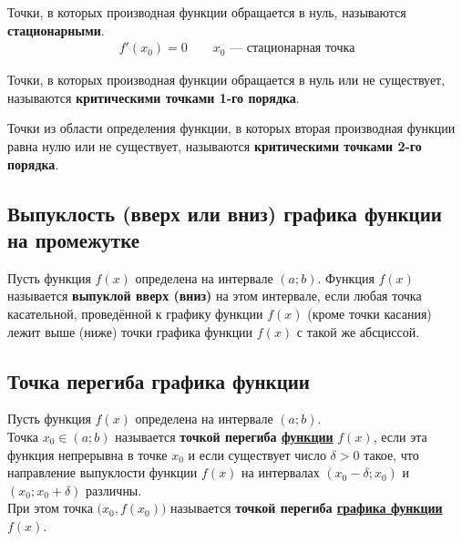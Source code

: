 \begin{definition}
	Точки, в которых производная функции обращается в нуль, называются \textbf{стационарными}.
	\begin{gather*}
		f'(x_0) = 0\qquad x_0 \text{ --- стационарная точка}
	\end{gather*}
\end{definition}

\begin{definition}
	Точки, в которых производная функции обращается в нуль или не существует, называются \textbf{критическими точками 1-го порядка}.
\end{definition}

\begin{definition}
	Точки из области определения функции, в которых вторая производная функции равна нулю или не существует, называются \textbf{критическими точками 2-го порядка}.
\end{definition}

\subsection{Выпуклость (вверх или вниз) графика функции на промежутке}

\begin{definition}
    Пусть функция $f(x)$ определена на интервале $(a;b)$. Функция $f(x)$ называется \textbf{выпуклой вверх (вниз)} на этом интервале, если любая точка касательной, проведённой к графику функции $f(x)$ (кроме точки касания) лежит выше (ниже) точки графика функции $f(x)$ с такой же абсциссой.
\end{definition}

\subsection{Точка перегиба графика функции}

\begin{definition}
    Пусть функция $f(x)$ определена на интервале $(a;b)$.\\
    Точка $x_0 \in (a;b)$ называется \textbf{точкой перегиба \underline{функции}} $f(x)$, если эта функция непрерывна в точке $x_0$ и если существует число $\delta > 0$ такое, что направление выпуклости функции $f(x)$ на интервалах $(x_0 - \delta; x_0)$ и $(x_0; x_0 + \delta)$ различны.\\
    При этом точка $\big(x_0, f(x_0)\big)$ называется \textbf{точкой перегиба \underline{графика функции}} $f(x)$.
\end{definition}

